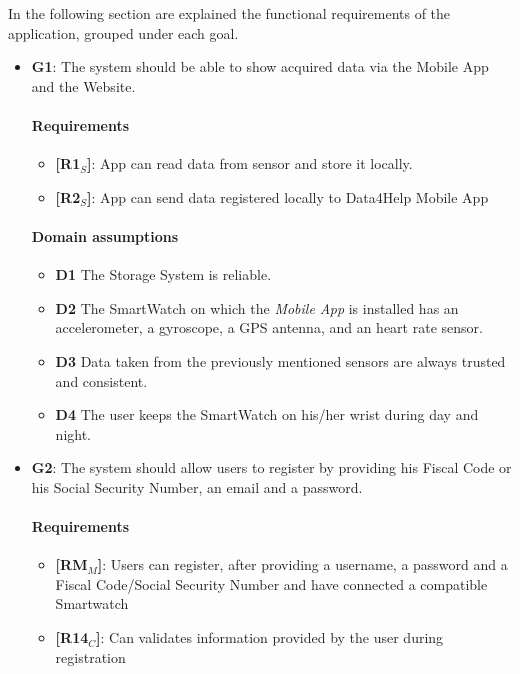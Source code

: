 In the following section are explained the functional requirements of the application, grouped under each goal.

\begin{itemize}
    \item \textbf{G1}: The system should be able to show acquired data via the Mobile App and the Website.
    \paragraph{Requirements}
   \begin{itemize}
    \item \textbf{[R1$_S$]}: App can read data from sensor and store it locally.
    \item \textbf{[R2$_S$]}: App can send data registered locally to Data4Help Mobile App
   \end{itemize}
   \paragraph{Domain assumptions}
   \begin{itemize}
    \item  \textbf{D1}  The Storage System is reliable.
    
    \item  \textbf{D2}  The SmartWatch on which the \textit{Mobile App} is installed has an accelerometer, a gyroscope, a GPS antenna, and an heart rate sensor.
    
    \item  \textbf{D3}  Data taken from the previously mentioned sensors are always trusted and consistent.
            
    \item  \textbf{D4}  The user keeps the SmartWatch on his/her wrist during day and night.
   \end{itemize}
   
    \item \textbf{G2}: The system should allow users to register by providing his Fiscal Code or his Social Security Number, an email and a password.
    \paragraph{Requirements}
   \begin{itemize}
    \item \textbf{[RM$_M$]}: Users can register, after providing a username, a password and a Fiscal Code/Social Security Number and have connected a compatible Smartwatch
    \item \textbf{[R14$_C$]}: Can validates information provided by the user during registration
   \end{itemize}

\end{itemize}
